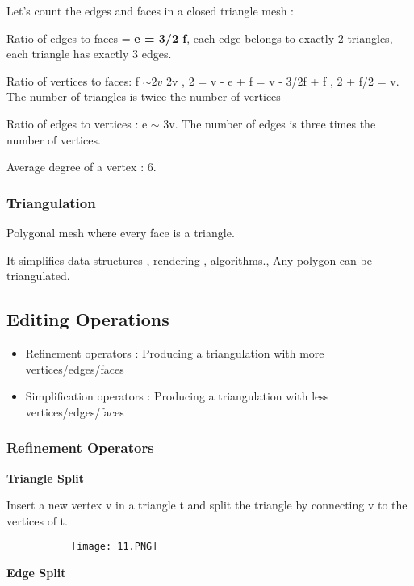 \documentclass{article}
\begin{document}
Let's count the edges and faces in a closed triangle mesh : 

Ratio of edges to faces = \textbf{e = 3/2 f}, each edge belongs to exactly 2 triangles, each triangle has exactly 3 edges.

Ratio of vertices to faces: f $\sim 2v$ 2v , 2 = v - e + f = v - 3/2f + f , 2 + f/2 = v. The number of triangles is twice the number of vertices

Ratio of edges to vertices : e $\sim $ 3v. The number of edges is three times the number of vertices.

Average degree of a vertex : 6. 

\subsubsection{Triangulation}

Polygonal mesh where every face is a triangle.

It simplifies data structures , rendering , algorithms., Any polygon can be triangulated.

\subsection{Editing Operations}

\begin{itemize}
    \item Refinement operators : Producing a triangulation with more vertices/edges/faces
    \item Simplification operators : Producing a triangulation with less vertices/edges/faces
\end{itemize}

\subsubsection{Refinement Operators}

\textbf{Triangle Split}

Insert a new vertex v in a triangle t and split the triangle by connecting v to the vertices of t.

\begin{figure}[ht!]
  \centering
  \begin{subfigure}[b]{0.4\linewidth}
    \texttt{[image: 11.PNG]}
  \end{subfigure}
\end{figure}

\textbf{Edge Split}
\end{document}
